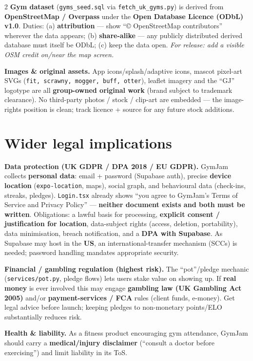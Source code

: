\documentclass[a4paper,8pt]{extarticle}
\newcommand{\lic}[1]{\textbf{#1}}
\begin{document}
\begin{multicols}{2}
\smallskip
\textbf{Gym dataset} (\texttt{gyms\_seed.sql} via \texttt{fetch\_uk\_gyms.py}) is derived from \textbf{OpenStreetMap / Overpass} under the \lic{Open Database Licence (ODbL) v1.0}. Duties: (a) \textbf{attribution} --- show ``© OpenStreetMap contributors'' wherever the data appears; (b) \textbf{share-alike} --- any publicly distributed derived database must itself be ODbL; (c) keep the data open. \emph{For release: add a visible OSM credit on/near the map screen.}

\smallskip
\textbf{Images \& original assets.} App icons/splash/adaptive icons, mascot pixel-art SVGs (\texttt{fit, scrawny, mogger, buff, otter}), leaflet imagery and the ``GJ'' logotype are all \textbf{group-owned original work} (brand subject to trademark clearance). No third-party photos / stock / clip-art are embedded --- the image-rights position is clean; track licence + source for any future stock additions.

\section{Wider legal implications}

\textbf{Data protection (UK GDPR / DPA 2018 / EU GDPR).} GymJam collects \textbf{personal data}: email + password (Supabase auth), precise \textbf{device location} (\texttt{expo-location}, maps), social graph, and behavioural data (check-ins, streaks, pledges). \texttt{Login.tsx} already shows ``you agree to GymJam's Terms of Service and Privacy Policy'' --- \textbf{neither document exists and both must be written}. Obligations: a lawful basis for processing, \textbf{explicit consent / justification for location}, data-subject rights (access, deletion, portability), data minimisation, breach notification, and a \textbf{DPA with Supabase}. As Supabase may host in the \textbf{US}, an international-transfer mechanism (SCCs) is needed; password handling mandates appropriate security.

\smallskip
\textbf{Financial / gambling regulation (highest risk).} The ``pot''/pledge mechanic (\texttt{services/pot.py}, pledge flows) lets users stake value on showing up. If \textbf{real money} is ever involved this may engage \textbf{gambling law (UK Gambling Act 2005)} and/or \textbf{payment-services / FCA} rules (client funds, e-money). Get legal advice before launch; keeping pledges to non-monetary points/ELO substantially reduces risk.

\smallskip
\textbf{Health \& liability.} As a fitness product encouraging gym attendance, GymJam should carry a \textbf{medical/injury disclaimer} (``consult a doctor before exercising'') and limit liability in its ToS.


\end{multicols}
\end{document}
